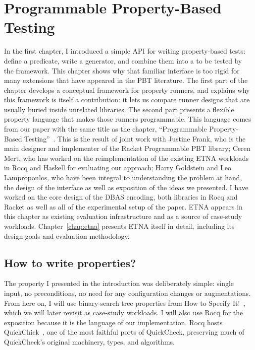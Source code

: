 
\renewcommand{\thechapter}{2}

\chapter{Programmable Property-Based Testing}\label{chap:ppbt}

In the first chapter, I introduced a simple API for writing property-based tests:
define a predicate, write a generator, and combine them into a  to be
tested by the framework. This chapter shows why that familiar interface is too rigid
for many extensions that have appeared in the PBT literature. The first part of the
chapter develops a conceptual framework for property runners, and explains why this
framework is itself a contribution: it lets us compare runner designs that are usually
buried inside unrelated libraries. The second part presents a flexible property
language that makes those runners programmable. This language comes from our paper with
the same title as the chapter, ``Programmable Property-Based
Testing''~\cite{keles2026programmablepropertybasedtesting}. This is the result of joint
work with Justine Frank, who is the main designer and implementer of the Racket
Programmable PBT library; Ceren Mert, who has worked on the reimplementation of the
existing ETNA workloads in Rocq and Haskell for evaluating our approach; Harry
Goldstein and Leo Lampropoulos, who have been integral to understanding the problem at
hand, the design of the interface as well as exposition of the ideas we presented. I
have worked on the core design of the DBAS encoding, both libraries in Rocq and Racket
as well as all of the experimental setup of the paper. ETNA appears in this chapter as
existing evaluation infrastructure and as a source of case-study workloads.
Chapter~\ref{chap:etna} presents ETNA itself in detail, including its design goals and
evaluation methodology.

\section{How to write properties?}

The property I presented in the introduction was deliberately simple: single input, no
preconditions, no need for any configuration changes or augmentations. From here on, I
will use binary-search tree properties from How to Specify It!~\cite{Hughes2019HowTS},
which we will later revisit as case-study workloads. I will also use Rocq for the exposition
because it is the language of our implementation. Rocq hosts
QuickChick~\cite{Pierce:SF4}, one of the most faithful ports of QuickCheck, preserving
much of QuickCheck's original machinery, types, and algorithms.

